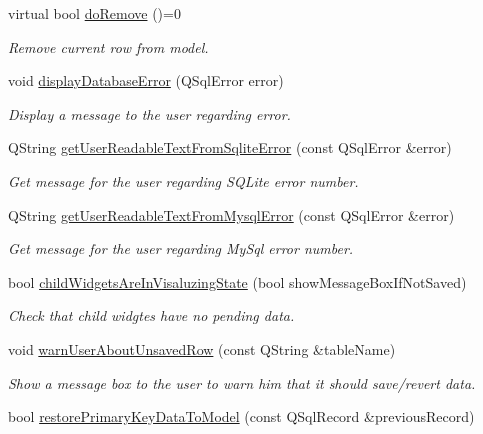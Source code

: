 \begin{DoxyCompactItemize}
virtual bool \hyperlink{classmdt_abstract_sql_widget_a41c30652fa9775c7b3bc6cb51004d4d5}{do\-Remove} ()=0
\begin{DoxyCompactList}\small\item\em Remove current row from model. \end{DoxyCompactList}\item 
void \hyperlink{classmdt_abstract_sql_widget_a3401020fed292da2c3b565a536f0be47}{display\-Database\-Error} (Q\-Sql\-Error error)
\begin{DoxyCompactList}\small\item\em Display a message to the user regarding error. \end{DoxyCompactList}\item 
Q\-String \hyperlink{classmdt_abstract_sql_widget_aeeddeec556cc20c5c9a49559df7898d9}{get\-User\-Readable\-Text\-From\-Sqlite\-Error} (const Q\-Sql\-Error \&error)
\begin{DoxyCompactList}\small\item\em Get message for the user regarding S\-Q\-Lite error number. \end{DoxyCompactList}\item 
Q\-String \hyperlink{classmdt_abstract_sql_widget_a1081ced9b96f60b3b39c6085bfe305d4}{get\-User\-Readable\-Text\-From\-Mysql\-Error} (const Q\-Sql\-Error \&error)
\begin{DoxyCompactList}\small\item\em Get message for the user regarding My\-Sql error number. \end{DoxyCompactList}\item 
bool \hyperlink{classmdt_abstract_sql_widget_aba32c9a31ff594ff63652ab98a2dfbcb}{child\-Widgets\-Are\-In\-Visaluzing\-State} (bool show\-Message\-Box\-If\-Not\-Saved)
\begin{DoxyCompactList}\small\item\em Check that child widgtes have no pending data. \end{DoxyCompactList}\item 
void \hyperlink{classmdt_abstract_sql_widget_ad20a178299c96790587b53380bb68282}{warn\-User\-About\-Unsaved\-Row} (const Q\-String \&table\-Name)
\begin{DoxyCompactList}\small\item\em Show a message box to the user to warn him that it should save/revert data. \end{DoxyCompactList}\item 
bool \hyperlink{classmdt_abstract_sql_widget_ac93226881ba03311a6a95ecd2ddaa003}{restore\-Primary\-Key\-Data\-To\-Model} (const Q\-Sql\-Record \&previous\-Record)

\end{DoxyCompactItemize}
